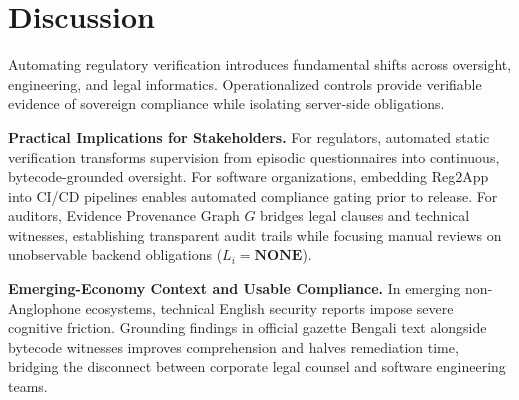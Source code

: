 \section{Discussion}
\label{sec:discussion}
Automating regulatory verification introduces fundamental shifts across oversight, engineering, and legal informatics. Operationalized controls provide verifiable evidence of sovereign compliance while isolating server-side obligations.

\noindent\textbf{Practical Implications for Stakeholders.} For regulators, automated static verification transforms supervision from episodic questionnaires into continuous, bytecode-grounded oversight. For software organizations, embedding Reg2App into CI/CD pipelines enables automated compliance gating prior to release. For auditors, Evidence Provenance Graph $G$ bridges legal clauses and technical witnesses, establishing transparent audit trails while focusing manual reviews on unobservable backend obligations ($L_i = \mathbf{NONE}$).

\noindent\textbf{Emerging-Economy Context and Usable Compliance.} In emerging non-Anglophone ecosystems, technical English security reports impose severe cognitive friction. Grounding findings in official gazette Bengali text alongside bytecode witnesses improves comprehension and halves remediation time, bridging the disconnect between corporate legal counsel and software engineering teams.
